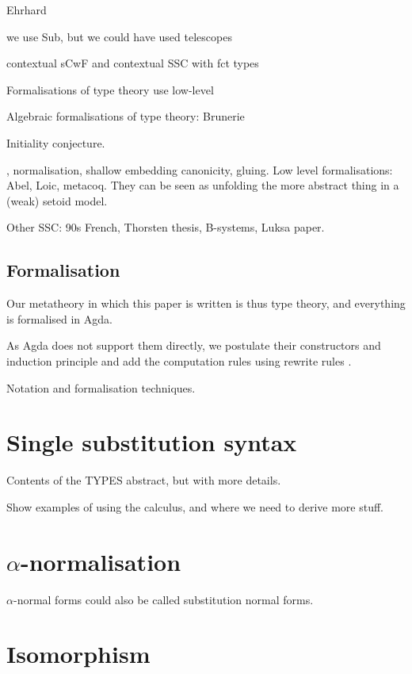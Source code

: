 \documentclass[sigplan,10pt,anonymous,review]{acmart}\settopmatter{printfolios=true,printccs=false,printacmref=false}
\begin{document}
Ehrhard

we use Sub, but we could have used telescopes

\cite{AHRENS_EMMENEGGER_NORTH_RIJKE_2023}

contextual sCwF and contextual SSC with fct types

Formalisations of type theory use low-level 

Algebraic formalisations of type theory: Brunerie

Initiality conjecture.

\cite{initiality-agda} \cite{DBLP:conf/popl/AltenkirchK16},
normalisation, shallow embedding canonicity, gluing. Low level
formalisations: Abel, Loic, metacoq. They can be seen as unfolding the
more abstract thing in a (weak) setoid model.

Other SSC: 90s French, Thorsten thesis, B-systems, Luksa paper.


\subsection{Formalisation}

Our metatheory in which this paper is
written is thus type theory, and everything is formalised in Agda.

As Agda does not support them directly, we postulate their
constructors and induction principle and add the computation rules
using rewrite rules \cite{DBLP:conf/types/Cockx19}.

Notation and formalisation techniques.

\section{Single substitution syntax}
\label{sec:ssc}

Contents of the TYPES abstract, but with more details.

Show examples of using the calculus, and where we need to derive more
stuff.

\section{$\alpha$-normalisation}
\label{sec:alpha}

$\alpha$-normal forms could also be called substitution normal forms.

\section{Isomorphism}
\label{sec:cwf}
\end{document}
